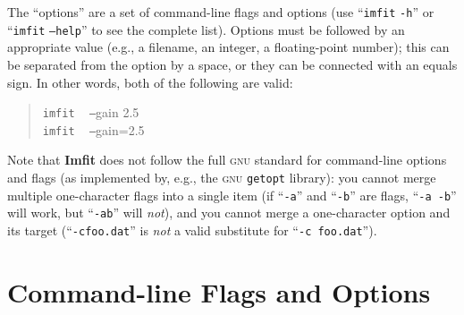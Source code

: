 \documentclass[10pt,a4paper,article]{memoir}
\newcommand{\imfit}{\textbf{Imfit}}
\newcommand{\imfitprog}{\texttt{imfit}}
\begin{document}
The ``options'' are a set of command-line flags and options (use ``\imfitprog{} \texttt{-h}''
or ``\imfitprog{} \texttt{--help}'' to see the complete list). Options must be followed by
an appropriate value (e.g., a filename, an integer, a floating-point number); this can
be separated from the option by a space, or they can be connected with an equals sign.
In other words, both of the following are valid:
\begin{quote}
\imfitprog{} ~ \texttt{--}gain 2.5 \\
\imfitprog{} ~ \texttt{--}gain=2.5
\end{quote}
Note that \imfit{} does not follow the full \textsc{gnu} standard for
command-line options and flags (as implemented by, e.g., the \textsc{gnu}
\texttt{getopt} library): you cannot merge multiple one-character flags
into a single item (if ``\texttt{-a}'' and ``\texttt{-b}'' are flags,
``\texttt{-a -b}'' will work, but ``\texttt{-ab}'' will \textit{not}), and you
cannot merge a one-character option and its target
(``\texttt{-cfoo.dat}'' is \textit{not} a valid substitute for
``\texttt{-c foo.dat}'').


\section{Command-line Flags and Options}\label{sec:imfit-flags}
\end{document}

